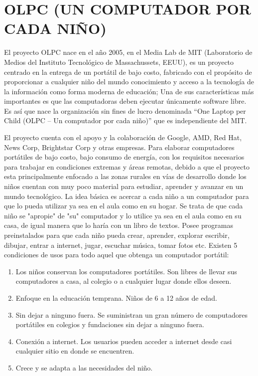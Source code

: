 \section*{OLPC (UN COMPUTADOR POR CADA NIÑO)}

El proyecto OLPC nace en el año 2005, en el Media Lab de MIT
(Laboratorio de Medios del Instituto Tecnológico de
Massachussets, EEUU), es un proyecto centrado en la entrega
de un portátil de bajo costo, fabricado con el propósito de
proporcionar a cualquier niño del mundo conocimiento y acceso
a la tecnología de la información como forma moderna de
educación; Una de sus características más importantes es que
las computadoras deben ejecutar únicamente software libre. Es
así que nace la organización sin fines de lucro denominada “One
Laptop per Child (OLPC – Un computador por cada niño)” que es
independiente del MIT.

El proyecto cuenta con el apoyo y la colaboración de Google,
AMD, Red Hat, News Corp, Brightstar Corp y otras empresas.
Para elaborar computadores portátiles de bajo costo, bajo
consumo de energía, con los requisitos necesarios para trabajar
en condiciones extremas y áreas remotas, debido a que el
proyecto esta principalmente enfocado a las zonas rurales en
vías de desarrollo donde los niños cuentan con muy poco
material para estudiar, aprender y avanzar en un mundo
tecnológico. La idea básica es acercar a cada niño a un
computador para que lo pueda utilizar ya sea en el aula como en
su hogar. Se trata de que cada niño se "apropie" de "su"
computador y lo utilice ya sea en el aula como en su casa, de
igual manera que lo haría con un libro de textos.
Posee programas preinstalados para que cada niño pueda crear,
aprender, explorar escribir, dibujar, entrar a internet, jugar,
escuchar música, tomar fotos etc.
Existen 5 condiciones de usos para todo aquel que obtenga un
computador portátil:
\begin{enumerate}
	\item Los niños conservan los computadores portátiles.
   Son libres de llevar sus computadores a casa, al colegio o
   a cualquier lugar donde ellos deseen.
   
   \item Enfoque en la educación temprana.
   Niños de 6 a 12 años de edad.
   
   \item Sin dejar a ninguno fuera.
   Se suministran un gran número de computadores
   portátiles en colegios y fundaciones sin dejar a ninguno
   fuera.
   
   \item Conexión a internet.
   Los usuarios pueden acceder a internet desde casi
   cualquier sitio en donde se encuentren.
   
   \item  Crece y se adapta a las necesidades del niño.
\end{enumerate}

